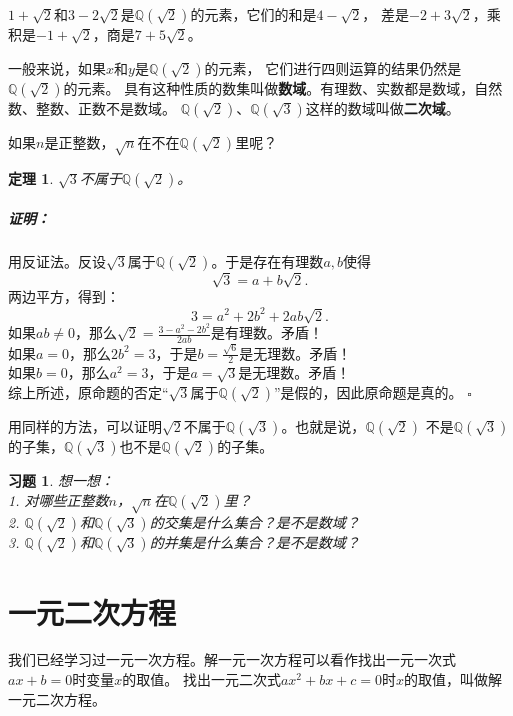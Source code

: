 \documentclass[12pt,UTF8]{ctexbook}
\newtheorem{tm}{定理}[section]
\newenvironment{proof2}{\paragraph{\textbf{证明：}}}{\hfill$\square$}
\newtheorem{xt}{习题}[section]
\begin{document}
$1 + \sqrt{2}$和$3 - 2\sqrt{2}$是$\mathbb{Q}(\sqrt{2})$的元素，它们的和是$4 - \sqrt{2}$，
差是$-2 + 3\sqrt{2}$，乘积是$-1 + \sqrt{2}$，商是$7 + 5\sqrt{2}$。

一般来说，如果$x$和$y$是$\mathbb{Q}(\sqrt{2})$的元素，
它们进行四则运算的结果仍然是$\mathbb{Q}(\sqrt{2})$的元素。
具有这种性质的数集叫做\textbf{数域}。有理数、实数都是数域，自然数、整数、正数不是数域。
$\mathbb{Q}(\sqrt{2})$、$\mathbb{Q}(\sqrt{3})$这样的数域叫做\textbf{二次域}。

如果$n$是正整数，$\sqrt{n}$在不在$\mathbb{Q}(\sqrt{2})$里呢？
\begin{tm}
    $\sqrt{3}$不属于$\mathbb{Q}(\sqrt{2})$。
\end{tm}\label{tm:3-1-0}
\begin{proof2}
    用反证法。反设$\sqrt{3}$属于$\mathbb{Q}(\sqrt{2})$。于是存在有理数$a,b$使得
    $$ \sqrt{3} = a + b\sqrt{2}.$$
    两边平方，得到：
    $$ 3 = a^2 + 2b^2 + 2ab\sqrt{2}.$$
    如果$ab \neq 0$，那么$ \sqrt{2} = \frac{3 - a^2 - 2b^2}{2ab}$是有理数。矛盾！\\
    如果$a = 0$，那么$2b^2 = 3$，于是$b = \frac{\sqrt{6}}{2}$是无理数。矛盾！\\
    如果$b = 0$，那么$a^2 = 3$，于是$a = \sqrt{3}$是无理数。矛盾！\\
    综上所述，原命题的否定“$\sqrt{3}$属于$\mathbb{Q}(\sqrt{2})$”是假的，因此原命题是真的。
\end{proof2}

用同样的方法，可以证明$\sqrt{2}$不属于$\mathbb{Q}(\sqrt{3})$。也就是说，$\mathbb{Q}(\sqrt{2})$
不是$\mathbb{Q}(\sqrt{3})$的子集，$\mathbb{Q}(\sqrt{3})$也不是$\mathbb{Q}(\sqrt{2})$的子集。

\begin{xt}\label{xt:3-1-0}
    想一想：\\
    1. 对哪些正整数$n$，$\sqrt{n}$在$\mathbb{Q}(\sqrt{2})$里？\\
    2. $\mathbb{Q}(\sqrt{2})$和$\mathbb{Q}(\sqrt{3})$的交集是什么集合？是不是数域？\\
    3. $\mathbb{Q}(\sqrt{2})$和$\mathbb{Q}(\sqrt{3})$的并集是什么集合？是不是数域？
\end{xt}


\chapter{一元二次方程}
我们已经学习过一元一次方程。解一元一次方程可以看作找出一元一次式$ax + b = 0$时变量$x$的取值。
找出一元二次式$ax^2 + bx + c = 0$时$x$的取值，叫做解一元二次方程。
\end{document}
